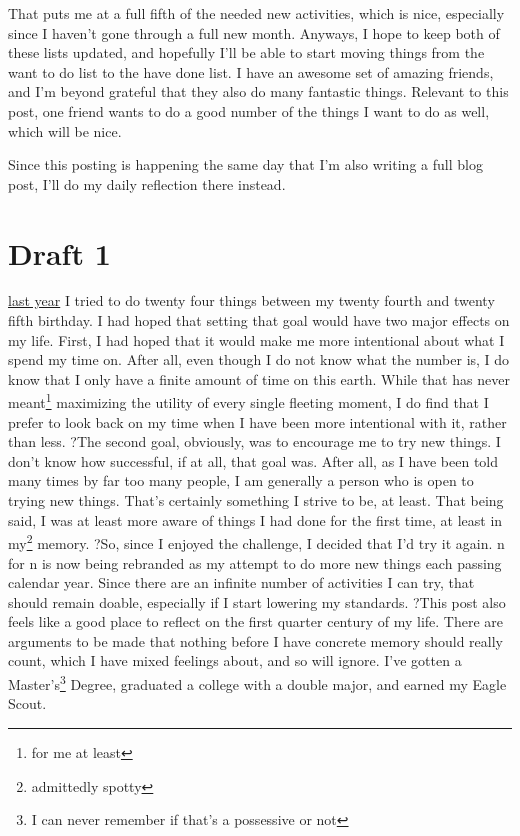 \documentclass[12pt]{article}[titlepage]
\newcommand{\1}{\={a}}
\newcommand{\2}{\={e}}
\newcommand{\3}{\={\i}}
\newcommand{\4}{\=o}
\newcommand{\5}{\=u}
\newcommand{\6}{\={A}}
\renewcommand{\,}{\textsuperscript{,}}
\begin{document}
That puts me at a full fifth of the needed new activities, which is nice, especially since I haven't gone through a full new month.
 Anyways, I hope to keep both of these lists updated, and hopefully I'll be able to start moving things from the want to do list to the have done list. I have an awesome set of amazing friends, and I'm beyond grateful that they also do many fantastic things. Relevant to this post, one friend wants to do a good number of the things I want to do as well, which will be nice.
 
Since this posting is happening the same day that I'm also writing a full blog post, I'll do my daily reflection there instead.
 

\section{Draft 1}
\href{twenty-four.html}{last year} I tried to do twenty four things between my twenty fourth and twenty fifth birthday.
I had hoped that setting that goal would have two major effects on my life.
First, I had hoped that it would make me more intentional about what I spend my time on.
After all, even though I do not know what the number is, I do know that I only have a finite amount of time on this earth.
While that has never meant\footnote{for me at least} maximizing the utility of every single fleeting moment, I do find that I prefer to look back on my time when I have been more intentional with it, rather than less.
?The second goal, obviously, was to encourage me to try new things.
I don't know how successful, if at all, that goal was.
After all, as I have been told many times by far too many people, I am generally a person who is open to trying new things.
That's certainly something I strive to be, at least.
That being said, I was at least more aware of things I had done for the first time, at least in my\footnote{admittedly spotty} memory.
?So, since I enjoyed the challenge, I decided that I'd try it again.
n for n is now being rebranded as my attempt to do more new things each passing calendar year.
Since there are an infinite number of activities I can try, that should remain doable, especially if I start lowering my standards.
?This post also feels like a good place to reflect on the first quarter century of my life.
There are arguments to be made that nothing before I have concrete memory should really count, which I have mixed feelings about, and so will ignore.
I've gotten a Master's\footnote{I can never remember if that's a possessive or not} Degree, graduated a college with a double major, and earned my Eagle Scout.
\end{document}
